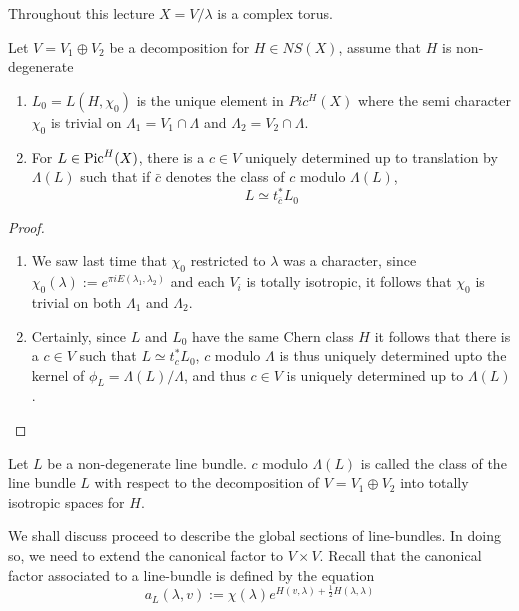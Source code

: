\begin{paragraph}{}Throughout this lecture $X=V/\lambda$ is a complex torus.\begin{lemma}
Let $V=V_1\oplus V_2$ be a decomposition for $H\in NS(X)$, assume that $H$ is non-degenerate 
\begin{enumerate}
\item $L_0=L(H,\chi_0)$ is the unique element in $Pic^H(X)$ where the semi character $\chi_0$ is trivial on $\Lambda_1=V_1\cap \Lambda$ and $\Lambda_2=V_2\cap \Lambda$.
\item For $L\in \operatorname{Pic}^H(X)$, there is a $c\in V$ uniquely determined up to translation by $\Lambda(L)$ such that if $\bar{c}$ denotes the class of $c$ modulo $\Lambda(L)$,
\begin{equation*}
L\simeq t_{\bar{c}}^* L_0 
\end{equation*}
\end{enumerate}
\end{lemma}
\begin{proof}
\begin{enumerate}
\item We saw last time that $\chi_0$ restricted to $\lambda$ was a character, since $\chi_0(\lambda):=e^{\pi i E(\lambda_1,\lambda_2)}$ and each $V_i$ is totally isotropic, it follows that $\chi_0$ is trivial on both $\Lambda_1$ and $\Lambda_2$.
\item
Certainly, since $L$ and $L_0$ have the same Chern class $H$ it follows that there is a $c\in V$ such that $L\simeq t_{c}^* L_0$, $c$ modulo $\Lambda$ is thus uniquely determined upto the kernel of $\phi_L=\Lambda(L)/\Lambda$, and thus $c\in V$ is uniquely determined up to $\Lambda(L)$.
\end{enumerate}
\end{proof}
\begin{definition} Let $L$ be a non-degenerate line bundle. $c$ modulo $\Lambda(L)$ is called the class of the line bundle $L$ with respect to the decomposition of $V=V_1\oplus V_2$ into totally isotropic spaces for $H$.
\end{definition}
We shall discuss proceed to describe the global sections of line-bundles. In doing so, we need to extend the canonical factor to $V\times V$. Recall that the canonical factor associated to a line-bundle is defined by the equation 
\begin{equation*}
a_L(\lambda, v):=\chi(\lambda) e^{H(v,\lambda)+\frac{1}{2} H(\lambda, \lambda)}
\end{equation*}
\begin{definition}

\end{definition}
\end{paragraph}
